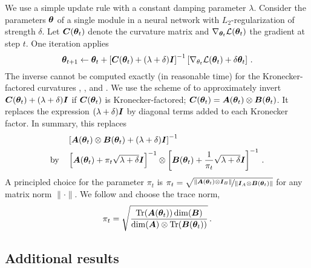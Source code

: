 We use a simple update rule with a constant damping parameter $\lambda$.
Consider the parameters ${\bm{\theta}}$ of a single module in a neural network with
$L_2$-regularization of strength $\delta$. Let ${\bm{C}}({\bm{\theta}}_t)$ denote the
curvature matrix and $\nabla_{{\bm{\theta}}_t}\mathcal{L}({\bm{\theta}}_t)$ the gradient at
step $t$. One iteration applies
\begin{equation}
  {\bm{\theta}}_{t+1}
  \leftarrow
  {\bm{\theta}}_{t}
  +
  \left[
    {\bm{C}}({\bm{\theta}}_t) + (\lambda + \delta) {\bm{I}}
  \right]^{-1}
  \left[
    \nabla_{\theta_t}\mathcal{L}({\bm{\theta}}_t) + \delta {\bm{\theta}}_{t}
  \right]\,{.}
\end{equation}
The inverse cannot be computed exactly (in reasonable time) for the
Kronecker-factored curvatures \KFAC, \KFLR, and \KFRA. We use the scheme of
\cite{martens2015optimizing} to approximately invert ${\bm{C}}({\bm{\theta}}_{t}) +
(\lambda + \delta) {\bm{I}}$ if ${\bm{C}}({\bm{\theta}}_{t})$ is Kronecker-factored;
${\bm{C}}({\bm{\theta}}_{t}) = {\bm{A}}({\bm{\theta}}_{t}) \otimes {\bm{B}}({\bm{\theta}}_{t})$. It replaces the
expression $(\lambda + \delta) {\bm{I}}$ by diagonal terms added to each Kronecker
factor. In summary, this replaces
\begin{align}
  \begin{split}
    &\left[
      {\bm{A}}({\bm{\theta}}_{t}) \otimes {\bm{B}}({\bm{\theta}}_{t}) + (\lambda + \delta) {\bm{I}}
      \right]^{-1}
    \\ \text{by}
    \quad&
           \left[
           {\bm{A}}({\bm{\theta}}_{t}) + \pi_t \sqrt{\lambda + \delta} {\bm{I}}
           \right]^{-1}
           \otimes
           \left[
           {\bm{B}}({\bm{\theta}}_{t}) + \frac{1}{\pi_t} \sqrt{\lambda + \delta} {\bm{I}}
           \right]^{-1}\,.
  \end{split}
\end{align}
A principled choice for the parameter $\pi_t$ is $ \pi_t = \sqrt{ \nicefrac{
    \lVert {\bm{A}}({\bm{\theta}}_t) \otimes {\bm{I}}_B \lVert }{ \lVert {\bm{I}}_A \otimes
    {\bm{B}}({\bm{\theta}}_{t}) \rVert } } $ for any matrix norm $\lVert \cdot \rVert$. We
follow \cite{martens2015optimizing} and choose the trace norm,
\begin{equation}
  \pi_t = \sqrt{\dfrac{\operatorname{Tr}({\bm{A}}({\bm{\theta}}_{t})) \dim({\bm{B}})}{\dim({\bm{A}}) \otimes \operatorname{Tr}({\bm{B}}({\bm{\theta}}_{t}))}}\,{.}
\end{equation}

\subsection{Additional results}\label{backpack::app:additional-results}

